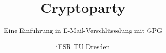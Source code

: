 \documentclass{beamer}
\title{Cryptoparty}
\subtitle{Eine Einführung in E-Mail-Verschlüsselung mit GPG}
\author{iFSR TU Dresden}
\begin{document}
\begin{frame}
  \maketitle
\end{frame}
\end{document}
